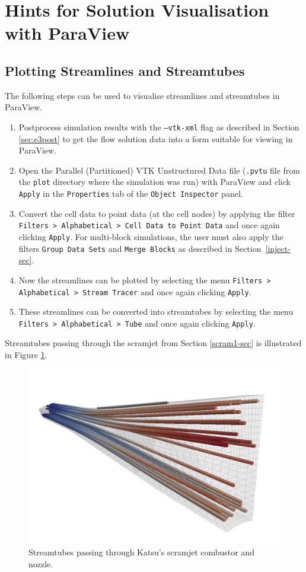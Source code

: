 \section{Hints for Solution Visualisation with ParaView}
\label{app:paraview}
\subsection{Plotting Streamlines and Streamtubes}
The following steps can be used to visualise streamlines and streamtubes in ParaView.
\begin{enumerate}
\item Postprocess simulation results with the \texttt{--vtk-xml} flag as described in 
Section \ref{sec:e3post} to get the flow solution data into a form suitable for viewing in ParaView.
\item Open the Parallel (Partitioned) VTK Unstructured Data file (\texttt{.pvtu} 
file from the \texttt{plot} directory where the simulation was run) with ParaView 
and click \texttt{Apply} in the \texttt{Properties} tab of the \texttt{Object Inspector} panel.
\item Convert the cell data to point data (at the cell nodes) by applying the
filter \texttt{Filters > Alphabetical > Cell Data to Point Data} and 
once again clicking \texttt{Apply}. For multi-block simulations, the user must
also apply the filters \texttt{Group Data Sets} and \texttt{Merge Blocks} as
described in Section~\ref{inject-sec}.
\item Now the streamlines can be plotted by selecting the menu 
\texttt{Filters > Alphabetical > Stream Tracer} and once again clicking \texttt{Apply}.
\item These streamlines can be converted into streamtubes by selecting the menu 
\texttt{Filters > Alphabetical > Tube} and once again clicking \texttt{Apply}.
\end{enumerate}
Streamtubes passing through the scramjet from Section \ref{scram1-sec} is illustrated 
in Figure \ref{fig:scram-tubes}.
\begin{figure}[htbp]
\begin{center}
\includegraphics[width=12cm]{../3D/scramjet-1/scramjet-streamtubes.png}
\end{center}
\caption{Streamtubes passing through Katsu's scramjet combustor and nozzle.}
\label{fig:scram-tubes}
\end{figure}

